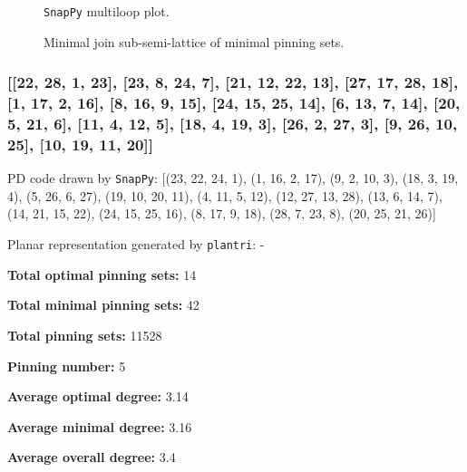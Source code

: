 \documentclass{article}%
\begin{document}
\begin{multicols}{2}
\begin{figure}[H]
\centering

\caption{\texttt{SnapPy} multiloop plot.}
\label{fig:tex/img/[[7, 28, 8, 1], [13, 6, 14, 7], [14, 27, 15, 28], [8, 15, 9, 16], [1, 25, 2, 24], [19, 12, 20, 13], [20, 5, 21, 6], [26, 9, 27, 10], [16, 26, 17, 25], [2, 17, 3, 18], [18, 23, 19, 24], [4, 11, 5, 12],.svg}
\end{figure}
\columnbreak

\begin{figure}[H]
\centering
\scalebox{0.8}{}
\caption{Minimal join sub-semi-lattice of minimal pinning sets.}
\label{fig:tex/img/[[7, 28, 8, 1], [13, 6, 14, 7], [14, 27, 15, 28], [8, 15, 9, 16], [1, 25, 2, 24], [19, 12, 20, 13], [20, 5, 21, 6], [26, 9, 27, 10], [16, 26, 17, 25], [2, 17, 3, 18], [18, 23, 19, 24], [4, 11, 5, 12],.pgf}
\end{figure}
\end{multicols}

\newpage

\subsubsection{[[22, 28, 1, 23], [23, 8, 24, 7], [21, 12, 22, 13], [27, 17, 28, 18], [1, 17, 2, 16], [8, 16, 9, 15], [24, 15, 25, 14], [6, 13, 7, 14], [20, 5, 21, 6], [11, 4, 12, 5], [18, 4, 19, 3], [26, 2, 27, 3], [9, 26, 10, 25], [10, 19, 11, 20]]}

{\small\noindent PD code drawn by \texttt{SnapPy}: [(23, 22, 24, 1), (1, 16, 2, 17), (9, 2, 10, 3), (18, 3, 19, 4), (5, 26, 6, 27), (19, 10, 20, 11), (4, 11, 5, 12), (12, 27, 13, 28), (13, 6, 14, 7), (14, 21, 15, 22), (24, 15, 25, 16), (8, 17, 9, 18), (28, 7, 23, 8), (20, 25, 21, 26)]}

{\small\noindent Planar representation generated by \texttt{plantri}: -}

\begin{multicols}{2}
{\normalsize \noindent\textbf{Total optimal pinning sets:} 14

\noindent\textbf{Total minimal pinning sets:} 42

\noindent\textbf{Total pinning sets:} 11528

\noindent\textbf{Pinning number:} 5

}
\columnbreak

{\normalsize \noindent\textbf{Average optimal degree:} 3.14

\noindent\textbf{Average minimal degree:} 3.16

\noindent\textbf{Average overall degree:} 3.4

}
\end{multicols}
\end{document}
